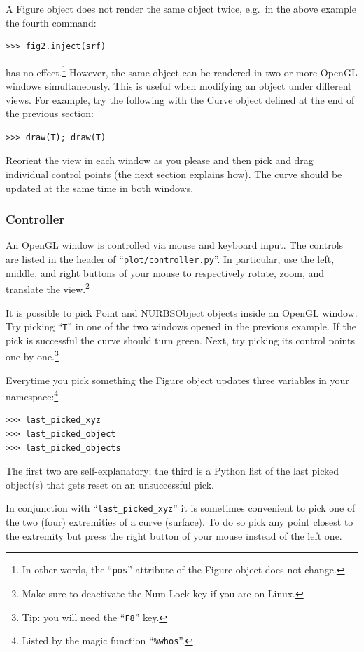 \documentclass[]{article}
\begin{document}
A Figure object does not render the same object twice, e.g.\ in the 
above example the fourth command:
\begin{verbatim}
>>> fig2.inject(srf)
\end{verbatim}
has no effect.\footnote{In other words, the ``\texttt{pos}'' attribute 
of the Figure object does not change.}  However, the same object can be 
rendered in two or more OpenGL windows simultaneously.  This is useful 
when modifying an object under different views.  For example, try the 
following with the Curve object defined at the end of the previous 
section:
\begin{verbatim}
>>> draw(T); draw(T)
\end{verbatim}
Reorient the view in each window as you please and then pick and drag 
individual control points (the next section explains how).  The curve 
should be updated at the same time in both windows.

\subsubsection{Controller}
\label{subsubsec:controller}

An OpenGL window is controlled via mouse and keyboard input.  The 
controls are listed in the header of ``\texttt{plot/controller.py}''.  
In particular, use the left, middle, and right buttons of your mouse to 
respectively rotate, zoom, and translate the view.\footnote{Make sure to 
deactivate the Num Lock key if you are on Linux.}

It is possible to pick Point and NURBSObject objects inside an OpenGL 
window.  Try picking ``\texttt{T}'' in one of the two windows opened in 
the previous example.  If the pick is successful the curve should turn 
green.  Next, try picking its control points one by one.\footnote{Tip: 
you will need the ``\texttt{F8}'' key.}

Everytime you pick something the Figure object updates three variables 
in your namespace:\footnote{Listed by the magic function 
``\texttt{\%whos}''.}
\begin{verbatim}
>>> last_picked_xyz
>>> last_picked_object
>>> last_picked_objects
\end{verbatim}
The first two are self-explanatory; the third is a Python list of the 
last picked object(s) that gets reset on an unsuccessful pick.

In conjunction with ``\texttt{last\_picked\_xyz}'' it is sometimes 
convenient to pick one of the two (four) extremities of a curve 
(surface).  To do so pick any point closest to the extremity but press 
the right button of your mouse instead of the left one.
\end{document}
